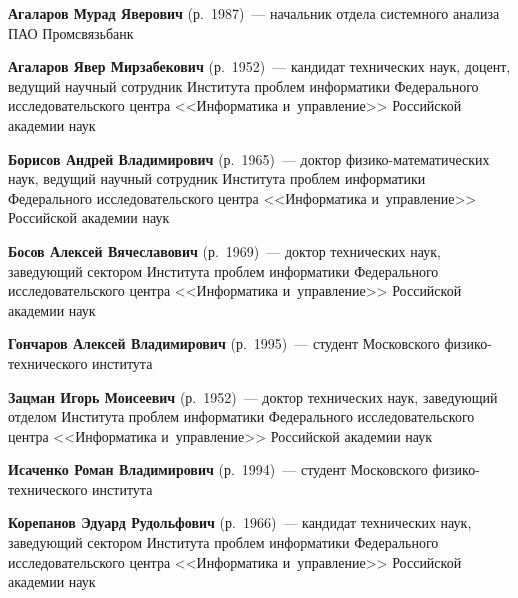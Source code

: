 \begin{multicols}{2}

\noindent
\textbf{Агаларов Мурад Яверович} (р.\ 1987)~---
начальник отдела системного анализа ПАО Промсвязьбанк

\vspace*{3pt}



\noindent
\textbf{Агаларов Явер Мирзабекович} (р.\ 1952)~--- 
кандидат технических наук, доцент, ведущий научный сотрудник 
Института проб\-лем информатики Федерального исследовательского центра 
<<Информатика и~управ\-ле\-ние>> Российской академии наук

 

\vspace*{3pt}

\noindent
\textbf{Борисов Андрей Владимирович} (р.\ 1965)~---
доктор фи\-зи\-ко-ма\-те\-ма\-ти\-че\-ских наук, ведущий научный сотрудник 
Института проб\-лем информатики Федерального исследовательского центра 
<<Информатика и~управ\-ле\-ние>> Российской академии наук


\vspace*{3pt}

\noindent
\textbf{Босов Алексей Вячеславович} (р.\ 1969)~---
доктор технических наук, заведующий 
сектором Института проб\-лем информатики Федерального исследовательского центра 
<<Информатика и~управ\-ле\-ние>> Российской академии наук


\vspace*{3pt}


\noindent
\textbf{Гончаров Алексей Владимирович} (р.\ 1995)~---
 студент Московского фи\-зи\-ко-тех\-ни\-че\-ско\-го института
 
 \vspace*{3pt}
 
 \noindent
\textbf{Зацман Игорь Моисеевич} (р.\ 1952)~---
доктор тех\-нических наук, заведующий отделом Института проб\-лем информатики 
Федерального исследовательского центра <<Информатика и~управ\-ле\-ние>> 
Российской академии наук

  \vspace*{3pt}
 
 \noindent
\textbf{Исаченко Роман Владимирович} (р.\ 1994)~--- 
студент Московского фи\-зи\-ко-тех\-ни\-че\-ско\-го института

\vspace*{3pt}

\noindent
\textbf{Корепанов Эдуард Рудольфович} (р.\ 1966)~---
кандидат технических наук, заведующий сектором Института проб\-лем 
информатики Федерального 
исследовательского центра <<Информатика и~управ\-ле\-ние>> Российской академии наук


\end{multicols}

